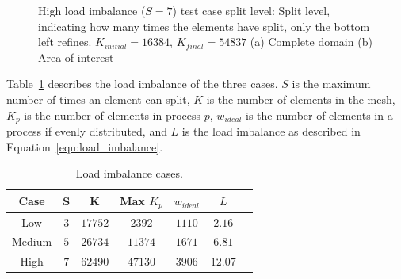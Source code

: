 \begin{figure}[H]
    \centering
    \hfill
    \caption{High load imbalance (\(S = 7\)) test case split level: Split level, indicating how many times the elements have split, only the bottom left refines. \(K_{initial} = 16384\), \(K_{final} = 54837\) (a) Complete domain (b) Area of interest}\label{fig:load_imbalance_case_high_s}
\end{figure}

Table~\ref{table:load_imbalance} describes the load imbalance of the three cases. \(S\) is the
maximum number of times an element can split, \(K\) is the number of elements in the mesh, \(K_p\)
is the number of elements in process \(p\), \(w_{ideal}\) is the number of elements in a process if
evenly distributed, and \(L\) is the load imbalance as described in
Equation~\ref{equ:load_imbalance}.

\begin{table}[H]
    \centering
    \begin{tabular}{ c c c c c c c }
        Case   & S     & K         & Max \(K_p\) & \(w_{ideal}\) & \(L\)     \\
        \midrule
        Low    & \(3\) & \(17752\) & \(2392\)    & \(1110\)      & \(2.16\)  \\
        Medium & \(5\) & \(26734\) & \(11374\)   & \(1671\)      & \(6.81\)  \\
        High   & \(7\) & \(62490\) & \(47130\)   & \(3906\)      & \(12.07\) \\
    \end{tabular}
    \caption{Load imbalance cases.}\label{table:load_imbalance}
\end{table}

